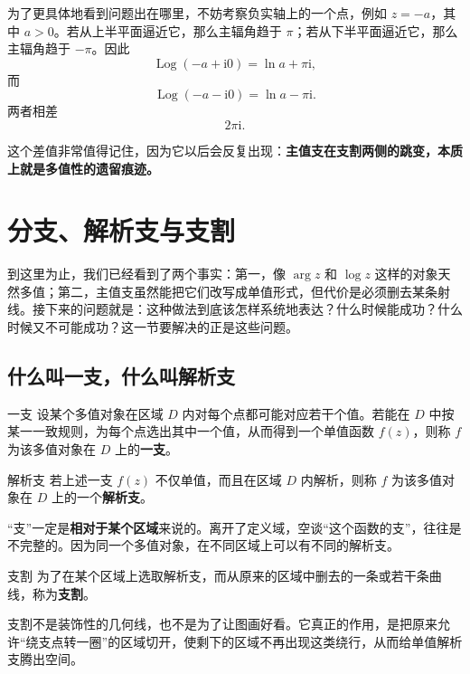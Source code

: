 为了更具体地看到问题出在哪里，不妨考察负实轴上的一个点，例如 $z=-a$，其中 $a>0$。若从上半平面逼近它，那么主辐角趋于 $\pi$；若从下半平面逼近它，那么主辐角趋于 $-\pi$。因此
\[
    \operatorname{Log}(-a+\mathrm{i}0)=\ln a+\pi\mathrm{i},
\]
而
\[
    \operatorname{Log}(-a-\mathrm{i}0)=\ln a-\pi\mathrm{i}.
\]
两者相差
\[
    2\pi\mathrm{i}.
\]

这个差值非常值得记住，因为它以后会反复出现：\textbf{主值支在支割两侧的跳变，本质上就是多值性的遗留痕迹。}

\section{分支、解析支与支割}

\begin{wulibj}[为什么这一节是全章核心]
到这里为止，我们已经看到了两个事实：第一，像 $\arg z$ 和 $\log z$ 这样的对象天然多值；第二，主值支虽然能把它们改写成单值形式，但代价是必须删去某条射线。接下来的问题就是：这种做法到底该怎样系统地表达？什么时候能成功？什么时候又不可能成功？这一节要解决的正是这些问题。
\end{wulibj}

\subsection{什么叫一支，什么叫解析支}

\begin{dingliyi}{一支}{}
设某个多值对象在区域 $D$ 内对每个点都可能对应若干个值。若能在 $D$ 中按某一一致规则，为每个点选出其中一个值，从而得到一个单值函数 $f(z)$，则称 $f$ 为该多值对象在 $D$ 上的\textbf{一支}。
\end{dingliyi}

\begin{dingliyi}{解析支}{}
若上述一支 $f(z)$ 不仅单值，而且在区域 $D$ 内解析，则称 $f$ 为该多值对象在 $D$ 上的一个\textbf{解析支}。
\end{dingliyi}

\begin{zhu}{}{}
``支''一定是\textbf{相对于某个区域}来说的。离开了定义域，空谈``这个函数的支''，往往是不完整的。因为同一个多值对象，在不同区域上可以有不同的解析支。
\end{zhu}

\begin{dingliyi}{支割}{}
为了在某个区域上选取解析支，而从原来的区域中删去的一条或若干条曲线，称为\textbf{支割}。
\end{dingliyi}

\begin{tishi}[支割的作用到底是什么]
支割不是装饰性的几何线，也不是为了让图画好看。它真正的作用，是把原来允许``绕支点转一圈''的区域切开，使剩下的区域不再出现这类绕行，从而给单值解析支腾出空间。
\end{tishi}

